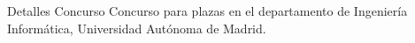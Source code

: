\begin{rubric}{Detalles Concurso}
	Concurso para plazas en el departamento de Ingeniería Informática, Universidad Autónoma de Madrid. 
\end{rubric}